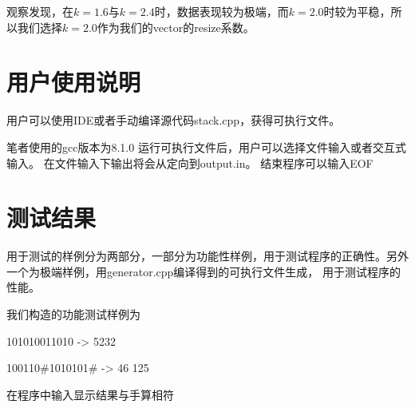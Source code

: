    观察发现，在$k=1.6$与$k=2.4$时，数据表现较为极端，而$k=2.0$时较为平稳，所以我们选择$k=2.0$作为我们的vector的resize系数。


\section{用户使用说明}
   用户可以使用IDE或者手动编译源代码stack.cpp，获得可执行文件。
      
   笔者使用的gcc版本为8.1.0
   运行可执行文件后，用户可以选择文件输入或者交互式输入。
   在文件输入下输出将会从定向到output.in。
   结束程序可以输入EOF

\section{测试结果}
   用于测试的样例分为两部分，一部分为功能性样例，用于测试程序的正确性。另外一个为极端样例，用generator.cpp编译得到的可执行文件生成，
   用于测试程序的性能。


   我们构造的功能测试样例为


   101010011010 -> 5232


   100110\#1010101\# -> 46 125


   在程序中输入显示结果与手算相符




